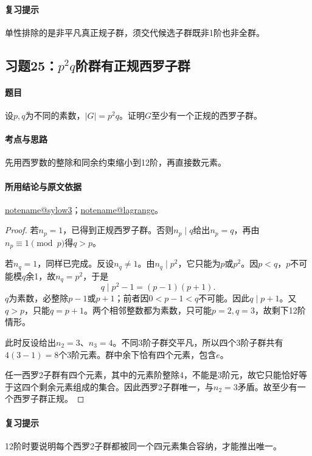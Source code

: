 \documentclass[UTF8,a4paper,11pt,fontset=windows]{ctexart}
\makeatletter
\newcommand{\noteref}[1]{\hyperref[note:#1]{\csname notename@#1\endcsname}}
\newcommand{\exref}[2]{\hyperref[ex:#1:#2]{第#1章习题#2}}
\makeatother
\begin{document}
\paragraph{复习提示}
单性排除的是非平凡真正规子群，须交代候选子群既非1阶也非全群。


\subsection{习题25：\texorpdfstring{$p^2q$阶群有正规西罗子群}{p2q阶群有正规西罗子群}}
\label{ex:2:25}

\paragraph{题目}
设$p,q$为不同的素数，$|G|=p^2q$。证明$G$至少有一个正规的西罗子群。

\paragraph{考点与思路}
先用西罗数的整除和同余约束缩小到12阶，再直接数元素。

\paragraph{所用结论与原文依据}
\noteref{sylow3}；\noteref{lagrange}。


\begin{proof}
若$n_p=1$，已得到正规西罗子群。否则$n_p\mid q$给出$n_p=q$，再由$n_p\equiv1\pmod p$得$q>p$。

若$n_q=1$，同样已完成。反设$n_q\ne1$。由$n_q\mid p^2$，它只能为$p$或$p^2$。因$p<q$，$p$不可能模$q$余1，故$n_q=p^2$，于是
\[
q\mid p^2-1=(p-1)(p+1).
\]
$q$为素数，必整除$p-1$或$p+1$；前者因$0<p-1<q$不可能。因此$q\mid p+1$。又$q>p$，只能$q=p+1$。两个相邻整数都为素数，只可能$p=2,q=3$，故剩下12阶情形。

此时反设给出$n_2=3$、$n_3=4$。不同3阶子群交平凡，所以四个3阶子群共有$4(3-1)=8$个3阶元素。群中余下恰有四个元素，包含$e$。

任一西罗2子群有四个元素，其中的元素阶整除4，不能是3阶元，故它只能恰好等于这四个剩余元素组成的集合。因此西罗2子群唯一，与$n_2=3$矛盾。故至少有一个西罗子群正规。
\end{proof}

\paragraph{复习提示}
12阶时要说明每个西罗2子群都被同一个四元素集合容纳，才能推出唯一。
\end{document}
